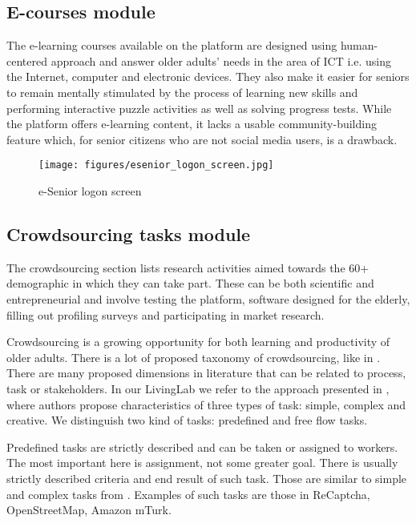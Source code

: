 \documentclass[sigconf]{acmart}
\begin{document}
\subsection{E-courses module}

The e-learning courses available on the platform are designed using human-centered approach and answer older adults' needs in the area of ICT i.e. using the Internet, computer and electronic devices. They also make it easier for seniors to remain mentally stimulated by the process of learning new skills and performing interactive puzzle activities as well as solving progress tests. While the platform offers e-learning content, it lacks a usable community-building feature which, for senior citizens who are not social media users, is a drawback.

\begin{figure}
\centering
\texttt{[image: figures/esenior\_logon\_screen.jpg]}
\caption{e-Senior logon screen}
\label{fig:esenior_logon}
\end{figure}

\subsection{Crowdsourcing tasks module}

The crowdsourcing section lists research activities aimed towards the 60+ demographic in which they can take part. These can be both scientific and entrepreneurial and involve testing the platform, software designed for the elderly, filling out profiling surveys and participating in market research.

Crowdsourcing is a growing opportunity for both learning and productivity of older adults. There is a lot of proposed taxonomy of crowdsourcing, like in \cite{geiger2011managing}. There are many proposed dimensions in literature that can be related to process, task or stakeholders. In our LivingLab we refer to the approach presented in \cite{schenk2011towards}, where authors propose characteristics of three types of task: simple, complex and creative. We distinguish two kind of tasks: predefined and free flow tasks.

Predefined tasks are strictly described and can be taken or assigned to workers. The most important here is assignment, not some greater goal. There is usually strictly described criteria and end result of such task. Those are similar to simple and complex tasks from \cite{schenk2011towards}. Examples of such tasks are those in ReCaptcha, OpenStreetMap, Amazon mTurk.
\end{document}
